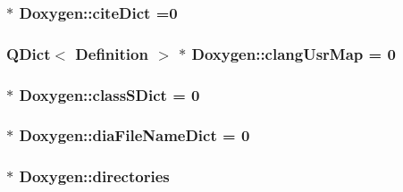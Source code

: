 \subsubsection[{cite\+Dict}]{ $\ast$ Doxygen\+::cite\+Dict =0\hspace{0.3cm}{\ttfamily [static]}}\label{class_doxygen_acd0346761dcfd739ea0722d6451d436b}
\hypertarget{class_doxygen_af917c09272753710958b7a4b6ca93bb4}{}
\subsubsection[{clang\+Usr\+Map}]{\setlength{\rightskip}{0pt plus 5cm}Q\+Dict$<$ {\bf Definition} $>$ $\ast$ Doxygen\+::clang\+Usr\+Map = 0\hspace{0.3cm}{\ttfamily [static]}}\label{class_doxygen_af917c09272753710958b7a4b6ca93bb4}
\hypertarget{class_doxygen_a707a44cf6887311937ada7bb7e4ffcc7}{}
\subsubsection[{class\+S\+Dict}]{ $\ast$ Doxygen\+::class\+S\+Dict = 0\hspace{0.3cm}{\ttfamily [static]}}\label{class_doxygen_a707a44cf6887311937ada7bb7e4ffcc7}
\hypertarget{class_doxygen_a98e71a5b297061b43e3e247a18bd2dd4}{}
\subsubsection[{dia\+File\+Name\+Dict}]{ $\ast$ Doxygen\+::dia\+File\+Name\+Dict = 0\hspace{0.3cm}{\ttfamily [static]}}\label{class_doxygen_a98e71a5b297061b43e3e247a18bd2dd4}
\hypertarget{class_doxygen_a7348a6369c6a86bded4abb5154e654cf}{}
\subsubsection[{directories}]{ $\ast$ Doxygen\+::directories\hspace{0.3cm}{\ttfamily [static]}}\label{class_doxygen_a7348a6369c6a86bded4abb5154e654cf}
\hypertarget{class_doxygen_adcaa04f254445beb29623884c29976d7}{}
